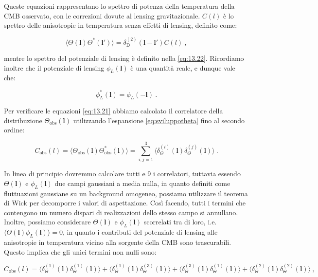 \documentclass[a4paper,10pt]{article}
\newcommand{\B}{\boldsymbol}
\begin{document}
Queste equazioni rappresentano lo spettro di potenza della temperatura della CMB osservato, con le correzioni dovute al lensing gravitazionale.
$C(l)$ è lo spettro delle anisotropie in temperatura senza effetti di lensing, definito come:

\begin{equation} \label{eq:Cl}
    \langle \Theta(\B l) \Theta^*(\B l') \rangle = \delta_{\text{D}}^{(2)} (\boldsymbol{l} - \boldsymbol{l}') C(l) \ ,
\end{equation}

mentre lo spettro del potenziale di lensing è definito nella \eqref{eq:13.22}.
Ricordiamo inoltre che il potenziale di lensing $\phi_L(\B l)$ è una quantità reale, e dunque vale che:

\begin{equation} \label{eq:phireale}
    \phi_L^*(\B l) = \phi_L(- \B l) \ .
\end{equation}

Per verificare le equazioni \eqref{eq:13.21} abbiamo calcolato il correlatore della distribuzione $\Theta_{\mathrm{obs}}(\B l)$ utilizzando l'espansione \eqref{eq:sviluppotheta} fino al secondo ordine:

\begin{equation} \label{eq:correltheta}
    C_{\text{obs}}(l) = \langle \Theta_{\mathrm{obs}}(\B l) \Theta_{\mathrm{obs}}^*(\B l) \rangle = \sum_{i,j = 1}^3 \langle \delta_\Theta^{(i)}(\B l) \delta_\Theta^{(j)}(\B l) \rangle \ .
\end{equation}

In linea di principio dovremmo calcolare tutti e 9 i correlatori, tuttavia essendo $\Theta(\B l)$ e $\phi_L(\B l)$ due campi gaussiani a media nulla, in quanto definiti come fluttuazioni gaussiane su un background omogeneo, possiamo utilizzare il teorema di Wick per decomporre i valori di aspettazione.
Così facendo, tutti i termini che contengono un numero dispari di realizzazioni dello stesso campo si annullano.
Inoltre, possiamo considerare $\Theta(\B l)$ e $\phi_L(\B l)$ scorrelati tra di loro, i.e. $\langle \Theta(\B l)\phi_L(\B l) \rangle = 0$, in quanto i contributi del potenziale di lensing alle anisotropie in temperatura vicino alla sorgente della CMB sono trascurabili.
Questo implica che gli unici termini non nulli sono:

\begin{equation}
    C_{\text{obs}}(l) = \langle \delta_\Theta^{(1)}(\B l) \delta_\Theta^{(1)}(\B l) \rangle + \langle \delta_\Theta^{(1)}(\B l) \delta_\Theta^{(3)}(\B l) \rangle + \langle \delta_\Theta^{(3)}(\B l) \delta_\Theta^{(1)}(\B l) \rangle + \langle \delta_\Theta^{(2)}(\B l) \delta_\Theta^{(2)}(\B l) \rangle \ ,
\end{equation}
\end{document}
